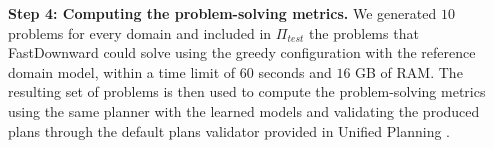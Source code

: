 \documentclass[letterpaper]{article} %
\newcommand{\T}{T}
\newcommand{\Ttrain}{\T_{\textit{train}}}
\newcommand{\Ttest}{\T_{\textit{test}}}
\newcommand{\miniparagraph}[1]{\textbf{#1.}}
\newcommand{\stest}{\ensuremath{S_{\textit{test}}}\xspace}
\newcommand{\ptest}{\ensuremath{\Pi_{\textit{test}}}\xspace}
\newif\ifaddcomments
\newcommand{\roni}[1]{\ifaddcomments{\textcolor{red}{[Roni: #1]}}\fi}
\newcommand{\leo}[1]{\ifaddcomments{\textcolor{pink}{[Leonardo: #1]}}\fi}
\begin{document}


%
\miniparagraph{Step 4: Computing the problem-solving metrics}
We generated $10$ problems for every domain and included in $\ptest$ the problems that FastDownward could solve using the greedy configuration with the reference domain model, within a time limit of $60$ seconds and $16$ GB of RAM. 
The resulting set of problems is then used to compute the problem-solving metrics using the same planner with the learned models and validating the produced plans through the default plans validator provided in Unified Planning \cite{unified_planning_softwarex2025} . 



\end{document}
